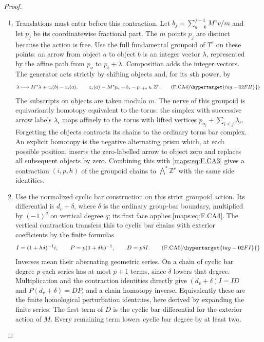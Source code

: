 \begin{proof}
\begin{enumerate}[label={$\langle1\rangle$\arabic*.}]
\item Translations must enter before this contraction.  Let
$b_j=\sum_{a=0}^{j-1}M^av/m$ and let $p_j$ be its coordinatewise
fractional part.  The $m$ points $p_j$ are distinct because the
action is free.  Use the full fundamental groupoid of $T^r$
on these points: an arrow from object $a$ to object $b$ is an
integer vector $\lambda$, represented by the affine path from
$p_a$ to $p_b+\lambda$.  Composition adds the integer vectors.
The generator acts strictly by shifting objects and, for its
$s$th power, by
\[
 \lambda\longmapsto M^s\lambda+z_s(b)-z_s(a),
 \qquad z_s(a)=M^sp_a+b_s-p_{a+s}\in\mathbb Z^r.             \tag{F.CA4}\hypertarget{tag-02FH}{}\label{maps:eq:F.CA4}
\]
The subscripts on objects are taken modulo $m$.
The nerve of this groupoid is equivariantly homotopy equivalent
to the torus: the simplex with successive arrow labels
$\lambda_i$ maps affinely to the torus with lifted vertices
$p_{a_j}+\sum_{i\leq j}\lambda_i$.
Forgetting the objects contracts its chains to the ordinary
torus bar complex.  An explicit homotopy is the negative
alternating prism which, at each possible position, inserts
the zero-labelled arrow to object zero and replaces all
subsequent objects by zero.  Combining this with \eqref{maps:eq:F.CA3}
gives a contraction $(i,p,h)$ of the groupoid chains to
$\bigwedge^*\mathbb Z^r$ with the same side identities.

\item Use the normalized cyclic bar construction on this strict
groupoid action.  Its differential is $d_v+\delta$, where
$\delta$ is the ordinary group-bar boundary, multiplied by
$(-1)^q$ on vertical degree $q$; its first face applies \eqref{maps:eq:F.CA4}.
The vertical contraction transfers this to cyclic bar chains
with exterior coefficients by the finite formulas
\[
 I=(1+h\delta)^{-1}i,\qquad
 P=p(1+\delta h)^{-1},\qquad D=p\delta I.                  \tag{F.CA5}\hypertarget{tag-02FI}{}\label{maps:eq:F.CA5}
\]
Inverses mean their alternating geometric series.  On a chain
of cyclic bar degree $p$ each series has at most $p+1$ terms,
since $\delta$ lowers that degree.  Multiplication and the
contraction identities directly give $(d_v+\delta)I=ID$ and
$P(d_v+\delta)=DP$,
and a chain homotopy inverse.  Equivalently these are the
finite homological perturbation identities, here derived by
expanding the finite series.  The first term of $D$ is the
cyclic bar differential for the exterior action of $M$.
Every remaining term lowers cyclic bar degree by at least two.


\end{enumerate}
\end{proof}
